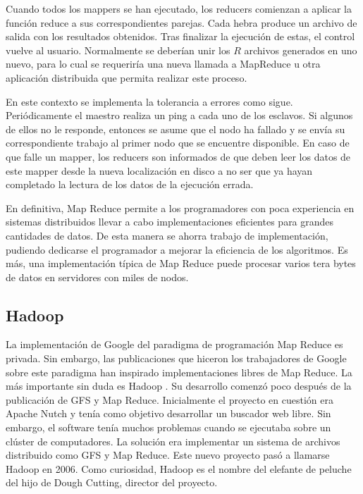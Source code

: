 \documentclass[10pt]{article}
\begin{document}
		Cuando todos los mappers se han ejecutado, los reducers comienzan a aplicar la función reduce a sus correspondientes parejas. Cada hebra produce un archivo de salida con los resultados obtenidos. Tras finalizar la ejecución de estas, el control vuelve al usuario. Normalmente se deberían unir los $R$ archivos generados en uno nuevo, para lo cual se requeriría una nueva llamada a MapReduce u otra aplicación distribuida que permita realizar este proceso.

		En este contexto se implementa la tolerancia a errores como sigue. Periódicamente el maestro realiza un ping a cada uno de los esclavos. Si algunos de ellos no le responde, entonces se asume que el nodo ha fallado y se envía su correspondiente trabajo al primer nodo que se encuentre disponible. En caso de que falle un mapper, los reducers son informados de que deben leer los datos de este mapper desde la nueva localización en disco a no ser que ya hayan completado la lectura de los datos de la ejecución errada.

		En definitiva, Map Reduce permite a los programadores con poca experiencia en sistemas distribuidos llevar a cabo implementaciones eficientes para grandes cantidades de datos. De esta manera se ahorra trabajo de implementación, pudiendo dedicarse el programador a mejorar la eficiencia de los algoritmos. Es más, una implementación típica de Map Reduce puede procesar varios tera bytes de datos en servidores con miles de nodos.


	\subsection{Hadoop} \label{sec:mr-hadoop:hadoop}

		La implementación de Google del paradigma de programación Map Reduce es privada. Sin embargo, las publicaciones que hiceron los trabajadores de Google sobre este paradigma han inspirado implementaciones libres de Map Reduce. La más importante sin duda es Hadoop \cite{hadoop-book}. Su desarrollo comenzó poco después de la publicación de GFS y Map Reduce. Inicialmente el proyecto en cuestión era Apache Nutch \cite{nutch} y tenía como objetivo desarrollar un buscador web libre. Sin embargo, el software tenía muchos problemas cuando se ejecutaba sobre un clúster de computadores. La solución era implementar un sistema de archivos distribuido como GFS y Map Reduce. Este nuevo proyecto pasó a llamarse Hadoop en 2006. Como curiosidad, Hadoop es el nombre del elefante de peluche del hijo de Dough Cutting, director del proyecto.
		
\end{document}

